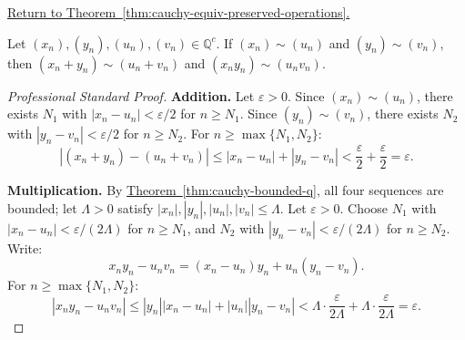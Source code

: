 
\newpage
{}
\label{prf:cauchy-equiv-preserved-operations}

\begin{remark*}[Return]
\hyperref[thm:cauchy-equiv-preserved-operations]{Return to Theorem~\ref*{thm:cauchy-equiv-preserved-operations}.}
\end{remark*}

\begin{theorem*}
Let $(x_n),(y_n),(u_n),(v_n) \in \mathbb{Q}^c$.
If $(x_n) \sim (u_n)$ and $(y_n) \sim (v_n)$, then
$(x_n + y_n) \sim (u_n + v_n)$ and $(x_n y_n) \sim (u_n v_n)$.
\end{theorem*}

\begin{proof}[Professional Standard Proof]
\LRAProofBodyStart
\textbf{Addition.}
Let $\varepsilon > 0$.  Since $(x_n) \sim (u_n)$, there exists $N_1$ with
$|x_n - u_n| < \varepsilon/2$ for $n \geq N_1$.
Since $(y_n) \sim (v_n)$, there exists $N_2$ with
$|y_n - v_n| < \varepsilon/2$ for $n \geq N_2$.
For $n \geq \max\{N_1, N_2\}$:
\[
|(x_n + y_n) - (u_n + v_n)|
\leq |x_n - u_n| + |y_n - v_n|
< \frac{\varepsilon}{2} + \frac{\varepsilon}{2} = \varepsilon.
\]

\textbf{Multiplication.}
By \hyperref[thm:cauchy-bounded-q]{Theorem~\ref*{thm:cauchy-bounded-q}},
all four sequences are bounded; let $\Lambda > 0$ satisfy $|x_n|, |y_n|, |u_n|, |v_n| \leq \Lambda$.
Let $\varepsilon > 0$.  Choose $N_1$ with $|x_n - u_n| < \varepsilon/(2\Lambda)$ for $n \geq N_1$,
and $N_2$ with $|y_n - v_n| < \varepsilon/(2\Lambda)$ for $n \geq N_2$.
Write:
\[
x_n y_n - u_n v_n
= (x_n - u_n)y_n + u_n(y_n - v_n).
\]
For $n \geq \max\{N_1, N_2\}$:
\[
|x_n y_n - u_n v_n|
\leq |y_n||x_n - u_n| + |u_n||y_n - v_n|
< \Lambda \cdot \frac{\varepsilon}{2\Lambda} + \Lambda \cdot \frac{\varepsilon}{2\Lambda}
= \varepsilon.
\]
\end{proof}

